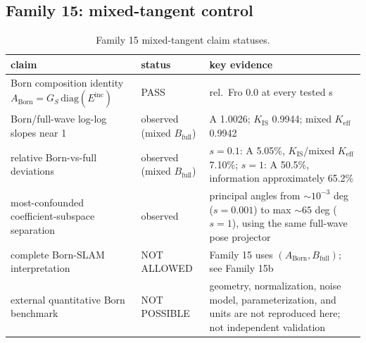 \documentclass[12pt]{article}
\begin{document}
\subsection{Family 15: mixed-tangent control}
\begin{table}[ht]
\centering
\small
\caption{Family 15 mixed-tangent claim statuses.}
\label{app:tab:f15}
\begin{tabular}{p{} p{} p{}}
\toprule
claim & status & key evidence \\
\midrule
Born composition identity
$A_{\mathrm{Born}}=G_S\,\mathrm{diag}(E^{\mathrm{inc}})$ & PASS &
rel.\ Fro 0.0 at every tested s \\
Born/full-wave log-log slopes near 1 & observed (mixed $B_{\mathrm{full}}$) &
A 1.0026; $K_{\mathrm{IS}}$ 0.9944; mixed $K_{\mathrm{eff}}$ 0.9942 \\
relative Born-vs-full deviations & observed (mixed $B_{\mathrm{full}}$) &
$s=0.1$: A 5.05\%, $K_{\mathrm{IS}}$/mixed $K_{\mathrm{eff}}$ 7.10\%;
$s=1$: A 50.5\%, information approximately 65.2\% \\
most-confounded coefficient-subspace separation & observed &
principal angles from $\sim10^{-3}$ deg ($s=0.001$) to max $\sim65$ deg
($s=1$), using the same full-wave pose projector \\
complete Born-SLAM interpretation & NOT ALLOWED &
Family 15 uses $(A_{\mathrm{Born}},B_{\mathrm{full}})$; see Family 15b \\
external quantitative Born benchmark & NOT POSSIBLE &
geometry, normalization, noise model, parameterization, and units are not
reproduced here; not independent validation \\
\bottomrule
\end{tabular}
\end{table}
\end{document}
